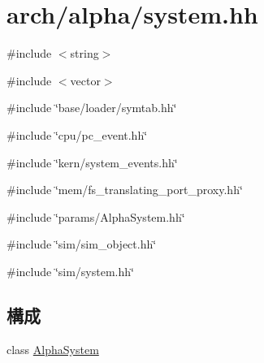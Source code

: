 \hypertarget{arch_2alpha_2system_8hh}{
\section{arch/alpha/system.hh}
\label{arch_2alpha_2system_8hh}
}
{\ttfamily \#include $<$string$>$}\par
{\ttfamily \#include $<$vector$>$}\par
{\ttfamily \#include \char`\"{}base/loader/symtab.hh\char`\"{}}\par
{\ttfamily \#include \char`\"{}cpu/pc\_\-event.hh\char`\"{}}\par
{\ttfamily \#include \char`\"{}kern/system\_\-events.hh\char`\"{}}\par
{\ttfamily \#include \char`\"{}mem/fs\_\-translating\_\-port\_\-proxy.hh\char`\"{}}\par
{\ttfamily \#include \char`\"{}params/AlphaSystem.hh\char`\"{}}\par
{\ttfamily \#include \char`\"{}sim/sim\_\-object.hh\char`\"{}}\par
{\ttfamily \#include \char`\"{}sim/system.hh\char`\"{}}\par
\subsection*{構成}
\begin{DoxyCompactItemize}
\item 
class \hyperlink{classAlphaSystem}{AlphaSystem}
\end{DoxyCompactItemize}
